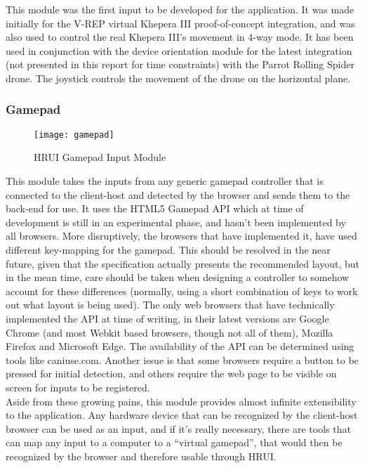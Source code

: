 This module was the first input to be developed for the application. It was made initially for the V-REP virtual Khepera III 
proof-of-concept integration, and was also used to control the real Khepera III's movement in 4-way mode. It has been used in 
conjunction with the device orientation module for the latest integration (not presented in this report for time constraints) 
with the Parrot Rolling Spider drone. The joystick controls the movement of the drone on the horizontal plane.
\subsubsection{Gamepad} \label{gamepad}
\begin{figure}[H]
\centering
\captionsetup{justification=centering}
\texttt{[image: gamepad]}
\caption{HRUI Gamepad Input Module}
\end{figure}
This module takes the inputs from any generic gamepad controller that is connected to the client-host and detected by the 
browser and sends them to the back-end for use. It uses the HTML5 Gamepad API which at time of development is still in an 
experimental phase, and hasn't been implemented by all browsers. More disruptively, the browsers that have implemented it, 
have used different key-mapping for the gamepad. This should be resolved in the near future, given that the specification 
actually presents the recommended layout\cite{w3cgamepad15}, but in the mean time, care should be taken when designing a 
controller to somehow account for these differences (normally, using a short combination of keys to work out what layout is 
being used). The only web browsers that have technically implemented the API at time of writing, in their latest versions are 
Google Chrome (and most Webkit based browsers, though not all of them), Mozilla Firefox and Microsoft Edge. The availability 
of the API can be determined using tools like caniuse.com\cite{caniusegamepad15}. Another issue is that some browsers require 
a button to be pressed for initial detection, and others require the web page to be visible on screen for inputs to be 
registered.\\

Aside from these growing pains, this module provides almost infinite extensibility to the application. Any hardware device 
that can be recognized by the client-host browser can be used as an input, and if it's really necessary, there are tools that 
can map any input to a computer to a ``virtual gamepad'', that would then be recognized by the browser and therefore usable 
through HRUI.\\

